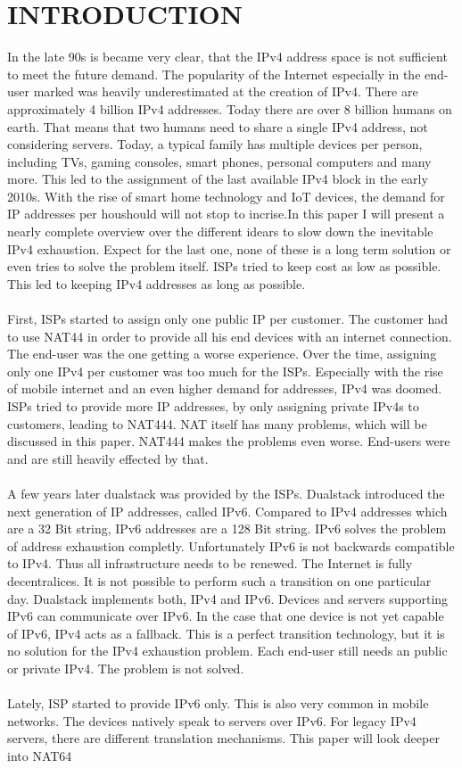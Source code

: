 \documentclass[format=sigconf, natbib=true, nonacm=true]{acmart}
\begin{document}
    \section{INTRODUCTION}
    In the late 90s is became very clear, that the IPv4 address space is not sufficient to meet the future demand. The popularity of the Internet especially in the end-user marked was heavily underestimated at the creation of IPv4. There are approximately 4 billion IPv4 addresses. Today there are over 8 billion humans on earth. That means that two humans need to share a single IPv4 address, not considering servers. Today, a typical family has multiple devices per person, including TVs, gaming consoles, smart phones, personal computers and many more. This led to the assignment of the last available IPv4 block in the early 2010s. With the rise of smart home technology and IoT devices, the demand for IP addresses per houshould will not stop to incrise.In this paper I will present a nearly complete overview over the different idears to slow down the inevitable IPv4 exhaustion. Expect for the last one, none of these is a long term solution or even tries to solve the problem itself. ISPs tried to keep cost as low as possible. This led to keeping IPv4 addresses as long as possible.\\\\First, ISPs started to assign only one public IP per customer. The customer had to use NAT44 in order to provide all his end devices with an internet connection. The end-user was the one getting a worse experience. Over the time, assigning only one IPv4 per customer was too much for the ISPs. Especially with the rise of mobile internet and an even higher demand for addresses, IPv4 was doomed. ISPs tried to provide more IP addresses, by only assigning private IPv4s to customers, leading to NAT444. NAT itself has many problems, which will be discussed in this paper. NAT444 makes the problems even worse. End-users were and are still heavily effected by that.\\\\A few years later dualstack was provided by the ISPs. Dualstack introduced the next generation of IP addresses, called IPv6. Compared to IPv4 addresses which are a 32 Bit string, IPv6 addresses are a 128 Bit string. IPv6 solves the problem of address exhaustion completly. Unfortunately IPv6 is not backwards compatible to IPv4. Thus all infrastructure needs to be renewed. The Internet is fully decentralices. It is not possible to perform such a transition on one particular day. Dualstack implements both, IPv4 and IPv6. Devices and servers supporting IPv6 can communicate over IPv6. In the case that one device is not yet capable of IPv6, IPv4 acts as a fallback. This is a perfect transition technology, but it is no solution for the IPv4 exhaustion problem. Each end-user still needs an public or private IPv4. The problem is not solved.\\\\Lately, ISP started to provide IPv6 only. This is also very common in mobile networks. The devices natively speak to servers over IPv6. For legacy IPv4 servers, there are different translation mechanisms. This paper will look deeper into NAT64 
\end{document}
